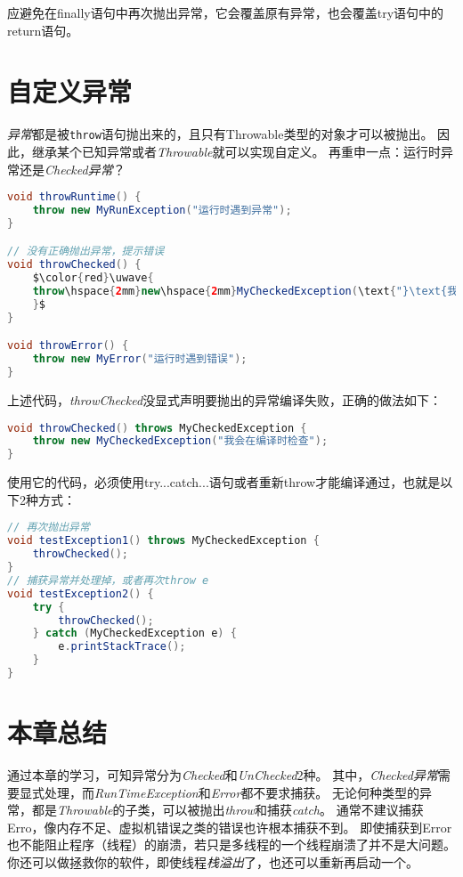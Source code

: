 应避免在finally语句中再次抛出异常，它会覆盖原有异常，也会覆盖try语句中的return语句。

\section{自定义异常}
\emph{异常}都是被\lstinline{throw}语句抛出来的，且只有Throwable类型的对象才可以被抛出。
因此，继承某个已知异常或者\emph{Throwable}就可以实现自定义。
再重申一点：运行时异常还是\emph{Checked异常}？
\begin{lstlisting}[language=Java,mathescape]
void throwRuntime() {
    throw new MyRunException("运行时遇到异常");
}

// 没有正确抛出异常，提示错误
void throwChecked() {
    $\color{red}\uwave{
    throw\hspace{2mm}new\hspace{2mm}MyCheckedException(\text{"}\text{我要在编译时检查}\text{"});
    }$
}

void throwError() {
    throw new MyError("运行时遇到错误");
}
\end{lstlisting}
\noindent
上述代码，\emph{throwChecked}没显式声明要抛出的异常编译失败，正确的做法如下：
\begin{lstlisting}[language=Java]
void throwChecked() throws MyCheckedException {
    throw new MyCheckedException("我会在编译时检查");
}
\end{lstlisting}
\noindent
使用它的代码，必须使用try...catch...语句或者重新throw才能编译通过，也就是以下2种方式：
\begin{lstlisting}[language=Java]
// 再次抛出异常
void testException1() throws MyCheckedException {
    throwChecked();
}
// 捕获异常并处理掉，或者再次throw e
void testException2() {
    try {
        throwChecked();
    } catch (MyCheckedException e) {
        e.printStackTrace();
    }
}
\end{lstlisting}

\section{本章总结}
通过本章的学习，可知异常分为\emph{Checked}和\emph{UnChecked}2种。
其中，\emph{Checked异常}需要显式处理，而\emph{RunTimeException}和\emph{Error}都不要求捕获。
无论何种类型的异常，都是\emph{Throwable}的子类，可以被抛出\emph{throw}和捕获\emph{catch}。
通常不建议捕获Erro，像内存不足、虚拟机错误之类的错误也许根本捕获不到。
即使捕获到Error也不能阻止程序（线程）的崩溃，若只是多线程的一个线程崩溃了并不是大问题。
你还可以做拯救你的软件，即使线程\emph{栈溢出}了，也还可以重新再启动一个。

